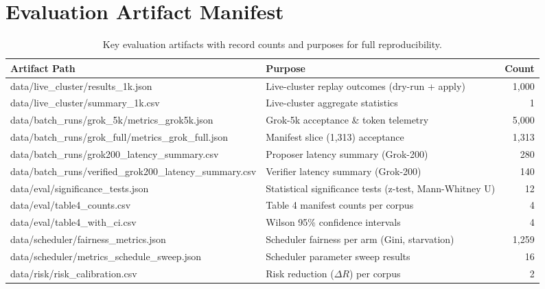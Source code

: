 
\section{Evaluation Artifact Manifest}
\label{app:artifact_manifest}
\begin{table}[t]
\centering
\small
\caption{Key evaluation artifacts with record counts and purposes for full reproducibility.}
\label{tab:artifact_manifest}
\begin{tabularx}{\textwidth}{@{}>{\ttfamily\raggedright\arraybackslash}p{3in}>{\raggedright\arraybackslash}X r@{}}
\toprule
\textrm{\textbf{Artifact Path}} & \textbf{Purpose} & \textbf{Count} \\
\midrule
data/live\_cluster/results\_1k.json & Live-cluster replay outcomes (dry-run + apply) & 1{,}000 \\
data/live\_cluster/summary\_1k.csv & Live-cluster aggregate statistics & 1 \\
data/batch\_runs/grok\_5k/metrics\_grok5k.json & Grok-5k acceptance \& token telemetry & 5{,}000 \\
data/batch\_runs/grok\_full/metrics\_grok\_full.json & Manifest slice (1{,}313) acceptance & 1{,}313 \\
data/batch\_runs/grok200\_latency\_summary.csv & Proposer latency summary (Grok-200) & 280 \\
data/batch\_runs/verified\_grok200\_latency\_summary.csv & Verifier latency summary (Grok-200) & 140 \\
data/eval/significance\_tests.json & Statistical significance tests (z-test, Mann-Whitney U) & 12 \\
data/eval/table4\_counts.csv & Table 4 manifest counts per corpus & 4 \\
data/eval/table4\_with\_ci.csv & Wilson 95\% confidence intervals & 4 \\
data/scheduler/fairness\_metrics.json & Scheduler fairness per arm (Gini, starvation) & 1{,}259 \\
data/scheduler/metrics\_schedule\_sweep.json & Scheduler parameter sweep results & 16 \\
data/risk/risk\_calibration.csv & Risk reduction ($\Delta R$) per corpus & 2 \\
\bottomrule
\end{tabularx}
\end{table}
